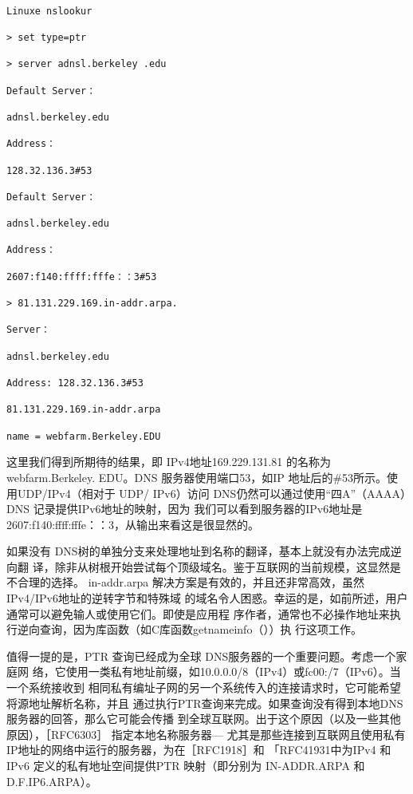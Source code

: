 \begin{verbatim}
    
Linuxe nslookur

> set type=ptr

> server adnsl.berkeley .edu

Default Server：

adnsl.berkeley.edu

Address：

128.32.136.3#53

Default Server：

adnsl.berkeley.edu

Address：

2607:f140:ffff:fffe：：3#53

> 81.131.229.169.in-addr.arpa.

Server：

adnsl.berkeley.edu

Address: 128.32.136.3#53

81.131.229.169.in-addr.arpa

name = webfarm.Berkeley.EDU
\end{verbatim}

这里我们得到所期待的结果，即 IPv4地址169.229.131.81 的名称为 webfarm.Berkeley.
EDU。DNS 服务器使用端口53，如IP 地址后的\#53所示。使用UDP/IPv4（相对于 UDP/
IPv6）访问 DNS仍然可以通过使用“四A”（AAAA）DNS 记录提供IPv6地址的映射，因为
我们可以看到服务器的IPv6地址是 2607:f140:ffff:fffe：：3，从输出来看这是很显然的。

如果没有 DNS树的单独分支来处理地址到名称的翻译，基本上就没有办法完成逆向翻
译，除非从树根开始尝试每个顶级域名。鉴于互联网的当前规模，这显然是不合理的选择。
in-addr.arpa 解决方案是有效的，并且还非常高效，虽然IPv4/IPv6地址的逆转字节和特殊域
的域名令人困惑。幸运的是，如前所述，用户通常可以避免输人或使用它们。即使是应用程
序作者，通常也不必操作地址来执行逆向查询，因为库函数（如C库函数getnameinfo（））执
行这项工作。

值得一提的是，PTR 查询已经成为全球 DNS服务器的一个重要问题。考虑一个家庭网
络，它使用一类私有地址前缀，如10.0.0.0/8（IPv4）或fc00:/7（IPv6）。当一个系统接收到
相同私有编址子网的另一个系统传入的连接请求时，它可能希望将源地址解析名称，并且
通过执行PTR查询来完成。如果查询没有得到本地DNS服务器的回答，那么它可能会传播
到全球互联网。出于这个原因（以及一些其他原因），［RFC6303］ 指定本地名称服务器—
尤其是那些连接到互联网且使用私有IP地址的网络中运行的服务器，为在［RFC1918］和
「RFC41931中为IPv4 和 IPv6 定义的私有地址空间提供PTR 映射（即分别为 IN-ADDR.ARPA
和 D.F.IP6.ARPA）。


